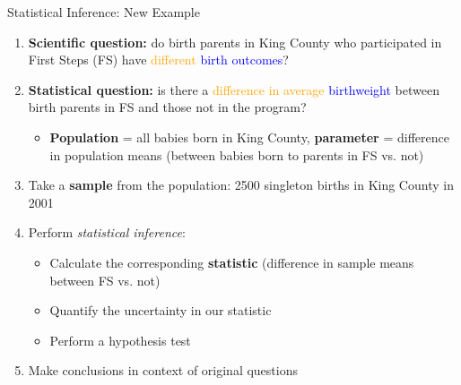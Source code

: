 \documentclass[10pt,t]{beamer}
\begin{document}
\begin{frame}{Statistical Inference: New Example}

\begin{enumerate}
	\item \textbf{Scientific question:} do birth parents in King County who participated in First Steps (FS) have \textcolor{orange}{different} \textcolor{blue}{birth outcomes}?
	\item \textbf{Statistical question:} is there a \textcolor{orange}{difference in average} \textcolor{blue}{birthweight} between birth parents in FS and those not in the program?
	\begin{itemize}
		\item \textbf{Population} = all babies born in King County, \textbf{parameter} = difference in population means (between babies born to parents in FS vs. not)
	\end{itemize}
	\item Take a \textbf{sample} from the population: 2500 singleton births in King County in 2001
	\item Perform \textit{statistical inference}:
	\begin{itemize}
		\item Calculate the corresponding \textbf{statistic} (difference in sample means between FS vs. not)
		\item Quantify the uncertainty in our statistic
		\item Perform a hypothesis test
	\end{itemize}
	\item Make conclusions in context of original questions
\end{enumerate}

\end{frame}
\end{document}
